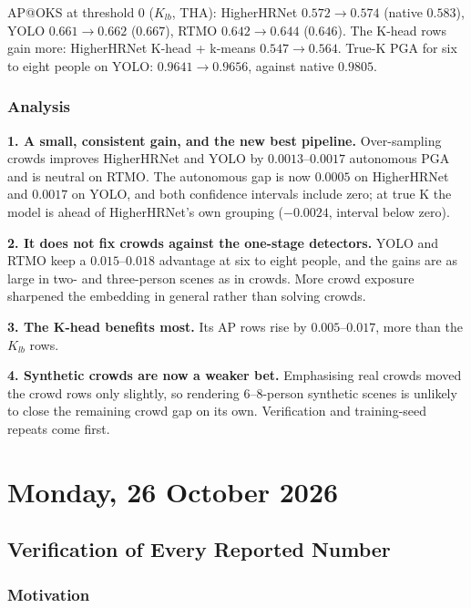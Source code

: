 \vspace{0.5em}

AP@OKS at threshold 0 ($K_{lb}$, THA): HigherHRNet $0.572 \rightarrow 0.574$ (native $0.583$), YOLO $0.661 \rightarrow 0.662$ ($0.667$), RTMO $0.642 \rightarrow 0.644$ ($0.646$). The K-head rows gain more: HigherHRNet K-head + k-means $0.547 \rightarrow 0.564$.
True-K PGA for six to eight people on YOLO: $0.9641 \rightarrow 0.9656$, against native $0.9805$.

\subsubsection{Analysis}

\textbf{1. A small, consistent gain, and the new best pipeline.} Over-sampling crowds improves HigherHRNet and YOLO by $0.0013$--$0.0017$ autonomous PGA and is neutral on RTMO. The autonomous gap is now $0.0005$ on HigherHRNet and $0.0017$ on YOLO, and both confidence intervals include zero; at true K the model is ahead of HigherHRNet's own grouping ($-0.0024$, interval below zero).

\textbf{2. It does not fix crowds against the one-stage detectors.} YOLO and RTMO keep a $0.015$--$0.018$ advantage at six to eight people, and the gains are as large in two- and three-person scenes as in crowds. More crowd exposure sharpened the embedding in general rather than solving crowds.

\textbf{3. The K-head benefits most.} Its AP rows rise by $0.005$--$0.017$, more than the $K_{lb}$ rows.

\textbf{4. Synthetic crowds are now a weaker bet.} Emphasising real crowds moved the crowd rows only slightly, so rendering 6--8-person synthetic scenes is unlikely to close the remaining crowd gap on its own. Verification and training-seed repeats come first.

\section[2026/10/26]{Monday, 26 October 2026}

\subsection{Verification of Every Reported Number}

\subsubsection{Motivation}


